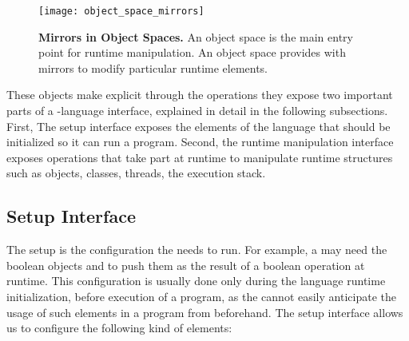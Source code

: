 \begin{figure}[htb]
\begin{center}
\texttt{[image: object\_space\_mirrors]}
\caption{\textbf{Mirrors in Object Spaces.} An object space is the main entry point for runtime manipulation. An object space provides with mirrors to modify particular runtime elements. \label{fig:objectSpaceMirrors}}
\end{center}
\end{figure}

These objects make explicit through the operations they expose two important parts of a \VM-language interface, explained in detail in the following subsections. First, The \VM setup interface exposes the elements of the language that should be initialized so it can run a program. Second, the runtime manipulation interface exposes operations that take part at runtime to manipulate runtime structures such as objects, classes, threads, the execution stack.

\subsection{\VM Setup Interface}

The \VM setup is the configuration the \VM needs to run.
For example, a \VM may need the boolean objects  and  to push them as the result of a boolean operation at runtime.
This configuration is usually done only during the language runtime initialization, before execution of a program, as the \VM cannot easily anticipate the usage of such elements in a program from beforehand.
The \VM setup interface allows us to configure the following kind of elements:

